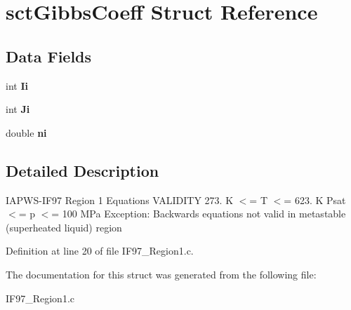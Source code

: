 \hypertarget{structsctGibbsCoeff}{\section{sct\-Gibbs\-Coeff Struct Reference}
\label{structsctGibbsCoeff}
}
\subsection*{Data Fields}
\begin{DoxyCompactItemize}
\item 
\hypertarget{structsctGibbsCoeff_adfc3cdb9b813401e141fb770ac5a0338}{int {\bfseries Ii}}\label{structsctGibbsCoeff_adfc3cdb9b813401e141fb770ac5a0338}

\item 
\hypertarget{structsctGibbsCoeff_affb68c8ad2362ab92364a1ecf78513ef}{int {\bfseries Ji}}\label{structsctGibbsCoeff_affb68c8ad2362ab92364a1ecf78513ef}

\item 
\hypertarget{structsctGibbsCoeff_ad5e000e0e834dc10bd6885439fc1c0e4}{double {\bfseries ni}}\label{structsctGibbsCoeff_ad5e000e0e834dc10bd6885439fc1c0e4}

\end{DoxyCompactItemize}


\subsection{Detailed Description}
I\-A\-P\-W\-S-\/\-I\-F97 Region 1 Equations V\-A\-L\-I\-D\-I\-T\-Y 273. K $<$= T $<$= 623. K Psat $<$= p $<$= 100 M\-Pa Exception\-: Backwards equations not valid in metastable (superheated liquid) region 

Definition at line 20 of file I\-F97\-\_\-\-Region1.\-c.



The documentation for this struct was generated from the following file\-:\begin{DoxyCompactItemize}
\item 
I\-F97\-\_\-\-Region1.\-c\end{DoxyCompactItemize}

